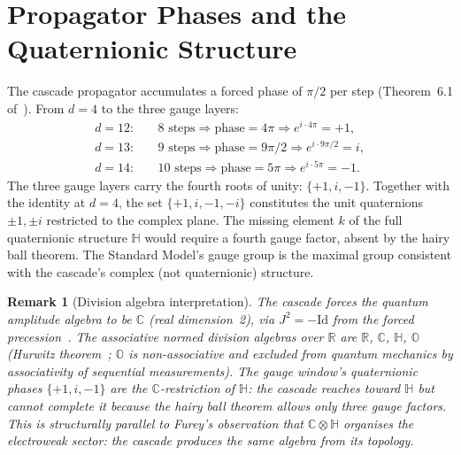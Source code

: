 \documentclass[12pt,a4paper]{article}
\newtheorem{remark}[theorem]{Remark}
\begin{document}
\section{Propagator Phases and the Quaternionic Structure}\label{sec:propagator-phases-and-the-quaternionic-s}

The cascade propagator accumulates a forced phase of $\pi/2$ per step
(Theorem~6.1 of~\cite{part2}). From $d=4$ to the three gauge layers:
\begin{align*}
d=12:&\quad 8 \text{ steps}\Rightarrow \text{phase}=4\pi \Rightarrow e^{i\cdot 4\pi}=+1,\\
d=13:&\quad 9 \text{ steps}\Rightarrow \text{phase}=9\pi/2 \Rightarrow e^{i\cdot 9\pi/2}=i,\\
d=14:&\quad 10 \text{ steps}\Rightarrow \text{phase}=5\pi \Rightarrow e^{i\cdot 5\pi}=-1.
\end{align*}
The three gauge layers carry the fourth roots of unity: $\{+1,i,-1\}$. Together with the
identity at $d=4$, the set $\{+1,i,-1,-i\}$ constitutes the unit quaternions $\pm 1,\pm i$
restricted to the complex plane. The missing element $k$ of the full quaternionic structure
$\mathbb{H}$ would require a fourth gauge factor, absent by the hairy ball theorem. The
Standard Model's gauge group is the maximal group consistent with the cascade's complex
(not quaternionic) structure.

\begin{remark}[Division algebra interpretation]
The cascade forces the quantum amplitude algebra to be $\mathbb{C}$ (real dimension~2), via
$J^2=-\mathrm{Id}$ from the forced precession~\cite{part2}. The associative normed division
algebras over $\mathbb{R}$ are $\mathbb{R}$, $\mathbb{C}$, $\mathbb{H}$, $\mathbb{O}$
(Hurwitz theorem~\cite{hurwitz}; $\mathbb{O}$ is non-associative and excluded from quantum
mechanics by associativity of sequential measurements). The gauge window's quaternionic
phases $\{+1,i,-1\}$ are the $\mathbb{C}$-restriction of $\mathbb{H}$: the cascade reaches
toward $\mathbb{H}$ but cannot complete it because the hairy ball theorem allows only three
gauge factors. This is structurally parallel to Furey's observation that $\mathbb{C}\otimes
\mathbb{H}$ organises the electroweak sector: the cascade produces the same algebra from
its topology.
\end{remark}
\end{document}
